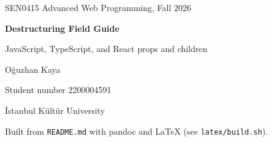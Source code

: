 \documentclass[11pt,a4paper]{article}
\begin{document}
\hypersetup{pageanchor=false}
\begin{titlepage}
  \centering
  \vspace*{5cm}
  {\sffamily\small SEN0415 Advanced Web Programming, Fall 2026\par}
  \vspace{1em}
  {\sffamily\Huge\bfseries\color{accent} Destructuring Field Guide\par}
  \vspace{0.8em}
  {\large JavaScript, TypeScript, and React props and children\par}
  \vspace{3em}
  {\large Oğuzhan Kaya\par}
  {Student number 2200004591\par}
  {İstanbul Kültür University\par}
  \vfill
  {\small Built from \texttt{README.md} with pandoc and LaTeX (see \texttt{latex/build.sh}).\par}
\end{titlepage}
\hypersetup{pageanchor=true}

\tableofcontents
\clearpage
{}


\end{document}
